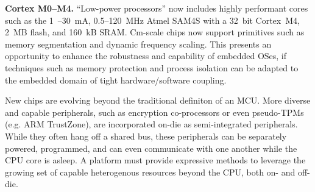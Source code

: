 \smallskip\noindent
\textbf{Cortex M0--M4.}
``Low-power processors'' now includes highly performant cores such as the
1~\uA--30~mA, 0.5--120~MHz Atmel SAM4S with a 32~bit Cortex~M4, 2~MB flash,
and 160~kB SRAM.
%
Cm-scale chips now support primitives such as memory segmentation and
dynamic frequency scaling. This presents an opportunity to enhance the
robustness and capability of embedded OSes, if techniques such as memory
protection and process isolation can be adapted to the embedded domain of
tight hardware/software coupling.
%

New chips are evolving beyond the traditional definiton of an MCU.  
More diverse
and capable peripherals, such as encryption co-processors or even pseudo-TPMs
(e.g. ARM TrustZone), are incorporated on-die as semi-integrated peripherals.
While they often hang off a shared bus, these peripherals can be separately
powered, programmed, and can even communicate with one another while the CPU
core is asleep. A platform must provide expressive methods to leverage
the growing set of capable heterogenous resources beyond the CPU, both on- and
off-die.




%

